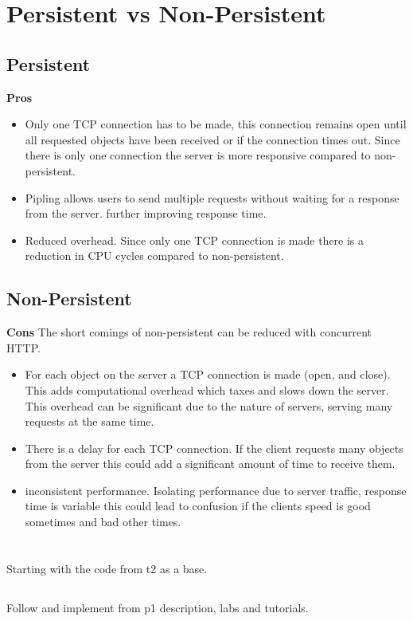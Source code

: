 \documentclass{article}
\begin{document}
\section{Persistent vs Non-Persistent}
\subsection{Persistent}
\textbf{Pros}
\begin{itemize}
    \item
        Only one TCP connection has to be made, this connection remains open until
        all requested objects have been received or if the connection times out.
        Since there is only one connection the server is more responsive compared to 
        non-persistent.
    \item
        Pipling allows users to send multiple requests without waiting for a response from the server.
        further improving response time.
    \item
        Reduced overhead. Since only one TCP connection is made there is a reduction in 
        CPU cycles compared to non-persistent.
\end{itemize}
\subsection{Non-Persistent}
\textbf{Cons}
The short comings of non-persistent can be reduced with concurrent HTTP.
\begin{itemize}
    \item 
        For each object on the server a TCP connection is made (open, and close). 
        This adds computational overhead which taxes and slows down the server. 
        This overhead can be significant due to the nature of servers, serving 
        many requests at the same time.
    \item 
        There is a delay for each TCP connection. If the client requests many objects
        from the server this could add a significant amount of time to receive them.
    \item
        inconsistent performance. Isolating performance due to server traffic,
        response time is variable this could lead to confusion if the clients 
        speed is good sometimes and bad other times.
\end{itemize}

\section{}
\subsection{}
Starting with the code from t2 as a base. 
\subsection{}
Follow and implement from p1 description, labs and tutorials.
\end{document}
